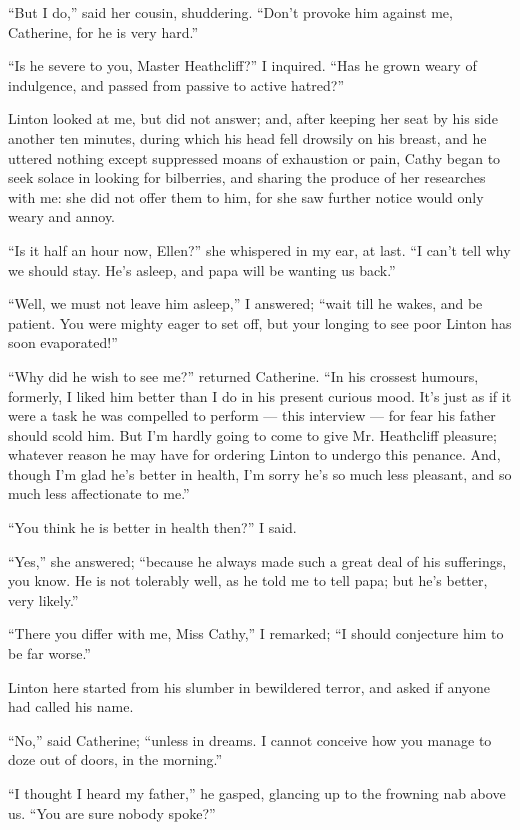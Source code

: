 \par “But I do,” said her cousin, shuddering. “Don't provoke him against me, Catherine, for he is very hard.”
\par “Is he severe to you, Master Heathcliff?” I inquired. “Has he grown weary of indulgence, and passed from passive to active hatred?”
\par Linton looked at me, but did not answer; and, after keeping her seat by his side another ten minutes, during which his head fell drowsily on his breast, and he uttered nothing except suppressed moans of exhaustion or pain, Cathy began to seek solace in looking for bilberries, and sharing the produce of her researches with me: she did not offer them to him, for she saw further notice would only weary and annoy.
\par “Is it half an hour now, Ellen?” she whispered in my ear, at last. “I can't tell why we should stay. He's asleep, and papa will be wanting us back.”
\par “Well, we must not leave him asleep,” I answered; “wait till he wakes, and be patient. You were mighty eager to set off, but your longing to see poor Linton has soon evaporated!”
\par “Why did he wish to see me?” returned Catherine. “In his crossest humours, formerly, I liked him better than I do in his present curious mood. It's just as if it were a task he was compelled to perform — this interview — for fear his father should scold him. But I'm hardly going to come to give Mr. Heathcliff pleasure; whatever reason he may have for ordering Linton to undergo this penance. And, though I'm glad he's better in health, I'm sorry he's so much less pleasant, and so much less affectionate to me.”
\par “You think he is better in health then?” I said.
\par “Yes,” she answered; “because he always made such a great deal of his sufferings, you know. He is not tolerably well, as he told me to tell papa; but he's better, very likely.”
\par “There you differ with me, Miss Cathy,” I remarked; “I should conjecture him to be far worse.”
\par Linton here started from his slumber in bewildered terror, and asked if anyone had called his name.
\par “No,” said Catherine; “unless in dreams. I cannot conceive how you manage to doze out of doors, in the morning.”
\par “I thought I heard my father,” he gasped, glancing up to the frowning nab above us. “You are sure nobody spoke?”
